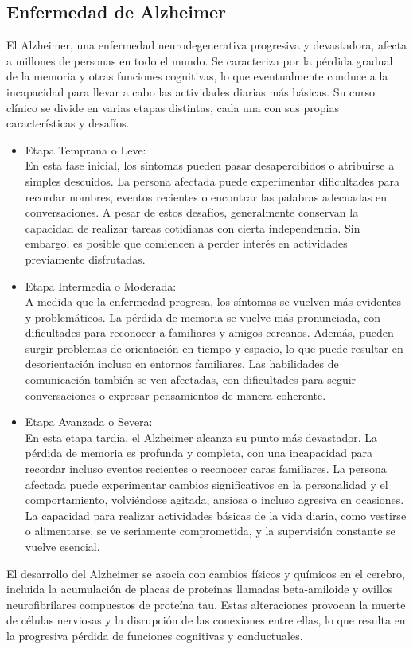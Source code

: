 \subsection{Enfermedad de Alzheimer}
El Alzheimer, una enfermedad neurodegenerativa progresiva y devastadora, afecta a millones de personas en todo el mundo. Se caracteriza por la pérdida gradual de la memoria y otras funciones cognitivas, lo que eventualmente conduce a la incapacidad para llevar a cabo las actividades diarias más básicas. Su curso clínico se divide en varias etapas distintas, cada una con sus propias características y desafíos.
\begin{itemize}
	\item Etapa Temprana o Leve:\\
	En esta fase inicial, los síntomas pueden pasar desapercibidos o atribuirse a simples descuidos. La persona afectada puede experimentar dificultades para recordar nombres, eventos recientes o encontrar las palabras adecuadas en conversaciones. A pesar de estos desafíos, generalmente conservan la capacidad de realizar tareas cotidianas con cierta independencia. Sin embargo, es posible que comiencen a perder interés en actividades previamente disfrutadas.
	
	\item Etapa Intermedia o Moderada:\\
	A medida que la enfermedad progresa, los síntomas se vuelven más evidentes y problemáticos. La pérdida de memoria se vuelve más pronunciada, con dificultades para reconocer a familiares y amigos cercanos. Además, pueden surgir problemas de orientación en tiempo y espacio, lo que puede resultar en desorientación incluso en entornos familiares. Las habilidades de comunicación también se ven afectadas, con dificultades para seguir conversaciones o expresar pensamientos de manera coherente.
	
	\item Etapa Avanzada o Severa:\\
	En esta etapa tardía, el Alzheimer alcanza su punto más devastador. La pérdida de memoria es profunda y completa, con una incapacidad para recordar incluso eventos recientes o reconocer caras familiares. La persona afectada puede experimentar cambios significativos en la personalidad y el comportamiento, volviéndose agitada, ansiosa o incluso agresiva en ocasiones. La capacidad para realizar actividades básicas de la vida diaria, como vestirse o alimentarse, se ve seriamente comprometida, y la supervisión constante se vuelve esencial.
\end{itemize}
El desarrollo del Alzheimer se asocia con cambios físicos y químicos en el cerebro, incluida la acumulación de placas de proteínas llamadas beta-amiloide y ovillos neurofibrilares compuestos de proteína tau. Estas alteraciones provocan la muerte de células nerviosas y la disrupción de las conexiones entre ellas, lo que resulta en la progresiva pérdida de funciones cognitivas y conductuales.

